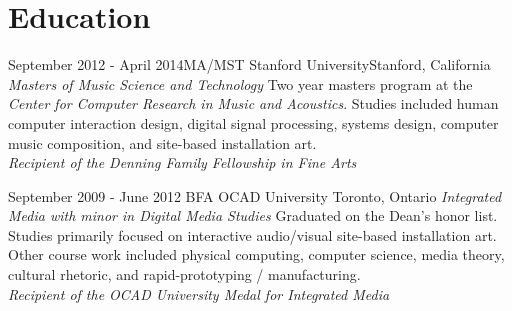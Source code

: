 \documentclass[10pt,a4paper,sans]{moderncv}   %
\begin{document}
\section{Education}

\cventry
  {September 2012 - April 2014}{MA/MST}
  {Stanford University}{Stanford, California}
  {\textit{Masters of Music Science and Technology}}
  {Two year masters program at the \textit{Center for Computer Research in Music and Acoustics}.  Studies included human computer interaction design, digital signal processing, systems design, computer music composition, and site-based installation art. \\\textit{Recipient of the Denning Family Fellowship in Fine Arts }}

\cventry
  {September 2009 - June 2012}
  {BFA}
  {OCAD University}
  {Toronto, Ontario}
  {\textit{Integrated Media with minor in Digital Media Studies}}
  {Graduated on the Dean's honor list. Studies primarily focused on interactive audio/visual site-based installation art.  Other course work included physical computing, computer science, media theory, cultural rhetoric, and rapid-prototyping / manufacturing. \\\textit{Recipient of the OCAD University Medal for Integrated Media }}


%
%
%
%
%
\end{document}
